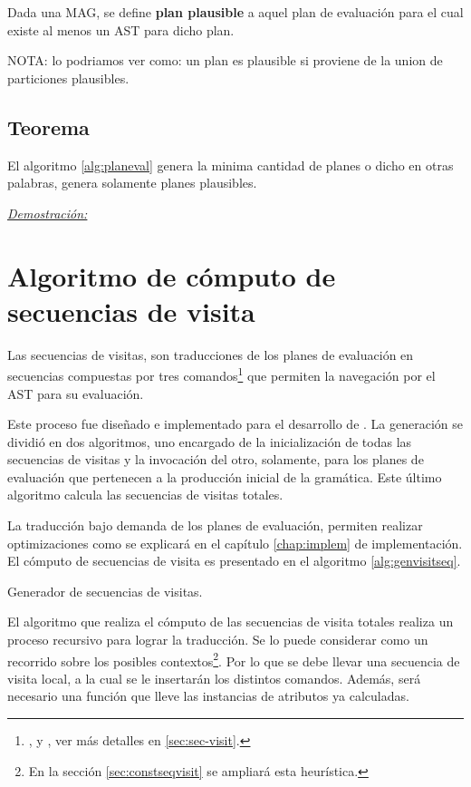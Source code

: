 \begin{definition}
\label{def:plan_plausible}
Dada una MAG, se define \textbf{plan plausible} a aquel plan de evaluación para el cual existe al menos un AST para dicho plan.

NOTA: lo podriamos ver como: un plan es plausible si proviene de la union de particiones plausibles.
\end{definition}


\subsection{Teorema}
\label{teo:planes_plausibles}
El algoritmo \ref{alg:planeval} genera la minima cantidad de planes o dicho en otras palabras, genera solamente planes plausibles.

\underline{\emph{Demostración:}}


\section{Algoritmo de cómputo de secuencias de visita}
\label{sec:algseqvisit}

Las secuencias de visitas, son traducciones de los planes de evaluación en secuencias compuestas por tres comandos\footnote{,  y , ver más detalles en \ref{sec:sec-visit}.} que permiten la navegación por el AST para su evaluación.

Este proceso fue diseñado e implementado para el desarrollo de \maggen. La generación se dividió en dos algoritmos, uno encargado de la inicialización de todas las secuencias de visitas y la invocación del otro, solamente, para los planes de evaluación que pertenecen a la producción inicial de la gramática. Este último algoritmo calcula las secuencias de visitas totales.

La traducción bajo demanda de los planes de evaluación, permiten realizar optimizaciones como se explicará en el capítulo \ref{chap:implem} de implementación. El cómputo de secuencias de visita es presentado en el algoritmo \ref{alg:genvisitseq}.

\begin{algorithm}[!ht]

\vspace{-0.5cm}
\caption{\label{alg:genvisitseq}Generador de secuencias de visitas.}
\end{algorithm}

El algoritmo que realiza el cómputo de las secuencias de visita totales realiza un proceso recursivo para lograr la traducción. Se lo puede considerar como un recorrido sobre los posibles contextos\footnote{En la sección \ref{sec:constseqvisit} se ampliará esta heurística.}. Por lo que se debe llevar una secuencia de visita local, a la cual se le insertarán los distintos comandos. Además, será necesario una función que lleve las instancias de atributos ya calculadas.

